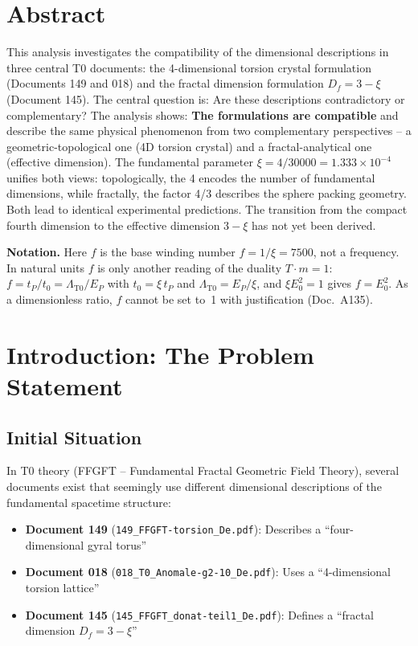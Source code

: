 \section*{Abstract}
		This analysis investigates the compatibility of the dimensional descriptions in three central T0 documents: the 4-dimensional torsion crystal formulation (Documents 149 and 018) and the fractal dimension formulation $D_f = 3 - \xi$ (Document 145). The central question is: Are these descriptions contradictory or complementary? The analysis shows: \textbf{The formulations are compatible} and describe the same physical phenomenon from two complementary perspectives -- a geometric-topological one (4D torsion crystal) and a fractal-analytical one (effective dimension). The fundamental parameter $\xi = 4/30000 = 1.333 \times 10^{-4}$ unifies both views: topologically, the 4 encodes the number of fundamental dimensions, while fractally, the factor 4/3 describes the sphere packing geometry. Both lead to identical experimental predictions. The transition from the compact fourth dimension to the effective dimension $3-\xi$ has not yet been derived.

	\medskip\noindent\textbf{Notation.} Here $f$ is the base winding number $f = 1/\xi = 7500$, not a frequency. In natural units $f$ is only another reading of the duality $T\cdot m = 1$: $f = t_P/t_0 = \Lambda_{\text{T0}}/E_P$ with $t_0 = \xi\,t_P$ and $\Lambda_{\text{T0}} = E_P/\xi$, and $\xi E_0^2 = 1$ gives $f = E_0^2$. As a dimensionless ratio, $f$ cannot be set to~1 with justification (Doc.~A135).

	
	
	\section{Introduction: The Problem Statement}
	
	\subsection{Initial Situation}
	
	In T0 theory (FFGFT -- Fundamental Fractal Geometric Field Theory), several documents exist that seemingly use different dimensional descriptions of the fundamental spacetime structure:
	
	\begin{itemize}
		\item \textbf{Document 149} (\texttt{149\_FFGFT-torsion\_De.pdf}): Describes a \enquote{four-dimensional gyral torus}
		\item \textbf{Document 018} (\texttt{018\_T0\_Anomale-g2-10\_De.pdf}): Uses a \enquote{4-dimensional torsion lattice}
		\item \textbf{Document 145} (\texttt{145\_FFGFT\_donat-teil1\_De.pdf}): Defines a \enquote{fractal dimension $D_f = 3 - \xi$}
	\end{itemize}
	
